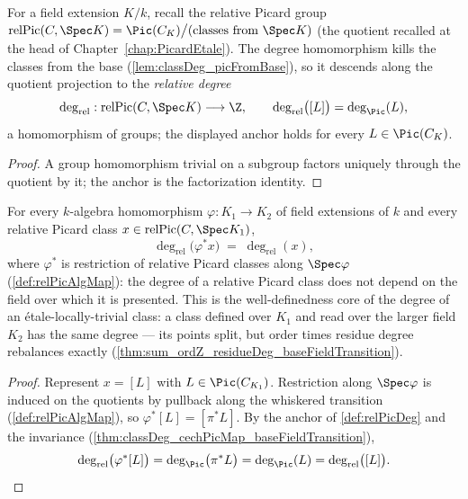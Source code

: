 \begin{definition}
  \label{def:relPicDeg}
  \leanok
  For a field extension \(K/k\), recall the relative Picard group
  \(\mathrm{relPic}(C, \Spec K) = \Pic(C_K) \big/ (\text{classes from } \Spec K)\)
  (the quotient recalled at the head of Chapter~\ref{chap:PicardEtale}). The degree
  homomorphism kills the classes from the base
  (\ref{lem:classDeg_picFromBase}), so it descends along the quotient projection to
  the \emph{relative degree}
  \[
    \deg_{\mathrm{rel}} : \mathrm{relPic}(C, \Spec K) \longrightarrow \Z,
    \qquad \deg_{\mathrm{rel}}\bigl([L]\bigr) = \deg_{\Pic}(L),
  \]
  a homomorphism of groups; the displayed anchor holds for every
  \(L \in \Pic(C_K)\).
\end{definition}
\begin{proof}
  \leanok
  A group homomorphism trivial on a subgroup factors uniquely through the quotient by
  it; the anchor is the factorization identity.
\end{proof}

\begin{theorem}
  \label{thm:relPicDeg_relPicAlgMap}
  \leanok
  For every \(k\)-algebra homomorphism \(\varphi : K_1 \to K_2\) of field extensions
  of \(k\) and every relative Picard class \(x \in \mathrm{relPic}(C, \Spec K_1)\),
  \[
    \deg_{\mathrm{rel}}\bigl(\varphi^{*}x\bigr) \;=\; \deg_{\mathrm{rel}}(x),
  \]
  where \(\varphi^{*}\) is restriction of relative Picard classes along
  \(\Spec\varphi\) (\ref{def:relPicAlgMap}): the degree of a relative Picard class
  does not depend on the field over which it is presented. This is the
  well-definedness core of the degree of an \'etale-locally-trivial class: a class
  defined over \(K_1\) and read over the larger field \(K_2\) has the same degree ---
  its points split, but order times residue degree rebalances exactly
  (\ref{thm:sum_ordZ_residueDeg_baseFieldTransition}).
\end{theorem}
\begin{proof}
  \leanok
  Represent \(x = [L]\) with \(L \in \Pic(C_{K_1})\). Restriction along
  \(\Spec\varphi\) is induced on the quotients by pullback along the whiskered
  transition (\ref{def:relPicAlgMap}), so \(\varphi^{*}[L] = [\pi^{*}L]\). By the
  anchor of \ref{def:relPicDeg} and the invariance
  (\ref{thm:classDeg_cechPicMap_baseFieldTransition}),
  \[
    \deg_{\mathrm{rel}}\bigl(\varphi^{*}[L]\bigr)
      = \deg_{\Pic}\bigl(\pi^{*}L\bigr)
      = \deg_{\Pic}(L)
      = \deg_{\mathrm{rel}}\bigl([L]\bigr). \qedhere
  \]
\end{proof}

